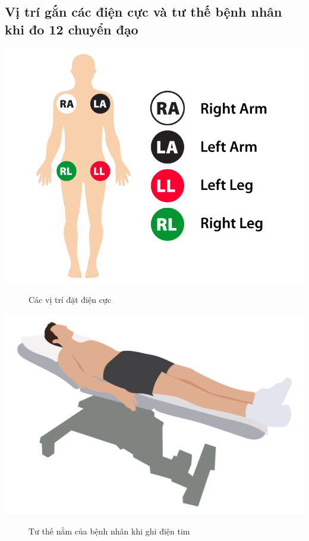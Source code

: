 \subsection{Vị trí gắn các điện cực và tư thế bệnh nhân khi đo 12 chuyển đạo}
\begin{center}
    \includegraphics[scale=.3]{image/week1/datdiencuc.png}
    \begin{figure}[htp]
    \begin{center}
    \end{center}
    \caption{Các vị trí đặt điện cực \cite{chuyendao}}
    \end{figure}
\end{center}
\begin{center}
    \includegraphics[scale=.25]{image/week1/benhnhannam.png}
    \begin{figure}[htp]
    \begin{center}
    \end{center}
    \caption{Tư thế  nằm của bệnh nhân khi ghi điện tim \cite{chuyendao}}
    \end{figure}
\end{center}


